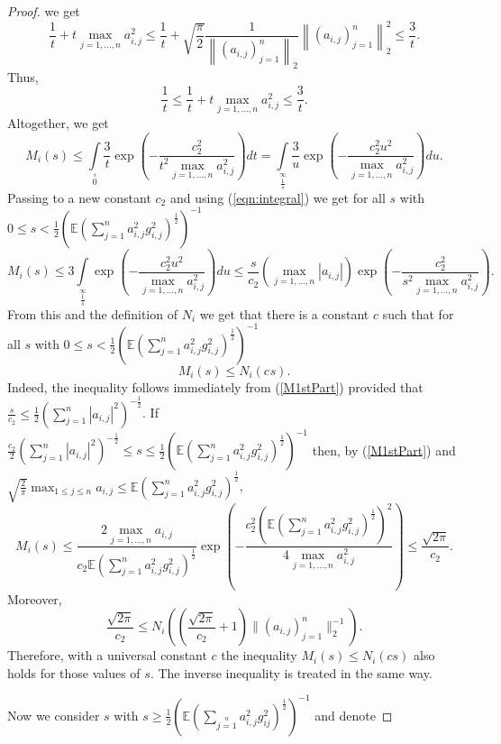 \documentclass[12pt,a4paper]{article}
\newcommand{\Ex}{\mathbb{E}}
\newcommand{\norm}[1]{\left \lVert#1 \right\rVert}
\begin{document}
\begin{proof}
we get
$$
\frac{1}{t}+t\max\limits_{j=1,\dots,n}a_{i,j}^2 
\leq \frac{1}{t}+\sqrt{\frac{\pi}{2}}
\frac{1}{\norm{(a_{i,j})_{j=1}^n}_2}\norm{(a_{i,j})_{j=1}^n}_2^2
\leq\frac{3}{t}.
$$
Thus,
$$
\frac{1}{t}\leq\frac{1}{t}+t\max\limits_{j=1,\dots,n}a_{i,j}^2
\leq\frac{3}{t}.
$$
Altogether, we get
$$
 M_i(s)
	\leq \int\limits_0\limits^{s}\frac{3}{t}\exp\left(-\frac{c_{2}^{2}}{t^2\max\limits_{j=1,\dots,n}a_{i,j}^2}\right)dt
	= \int\limits_{\frac{1}{s}}\limits^{\infty}\frac{3}{u}\exp\left(-\frac{c_{2}^{2}u^{2}}{\max\limits_{j=1,\dots,n}a_{i,j}^2}\right)du.
$$
Passing to a new constant $c_{2}$ and using (\ref{eqn:integral}) we get for all
$s$ with 
$0\leq s<\frac{1}{2}\left(\Ex\left(\sum_{j=1}^na_{i,j}^2g_{i,j}^2\right)^{\frac{1}{2}}\right)^{-1}$
\begin{equation}\label{M1stPart}
M_i(s)
\leq3\int\limits_{\frac{1}{s}}\limits^{\infty}\exp\left(-\frac{c_{2}^{2}u^{2}}{\max\limits_{j=1,\dots,n}a_{i,j}^2}\right)du
\leq \frac{s}{c_{2}}(\max\limits_{j=1,\dots,n}|a_{i,j}|)\exp\left(-\frac{c_{2}^{2}}{s^2\max\limits_{j=1,\dots,n}a_{i,j}^2}\right).
\end{equation}
From this and the definition of $N_{i}$ we get that there is a constant $c$ such that for all $s$ with 
$0\leq s<\frac{1}{2}\left(\Ex\left(\sum_{j=1}^na_{i,j}^2g_{i,j}^2\right)^{\frac{1}{2}}\right)^{-1}$
$$
M_{i}(s)\leq N_{i}(c_{}s).
$$
Indeed, the inequality follows immediately from
(\ref{M1stPart}) provided that $\frac{s}{c_{2}}\leq\frac{1}{2}\left(\sum_{j=1}^n|a_{i,j}|^2\right)^{-\frac{1}{2}}$. If 
$\frac{c_{2}}{2}\left(\sum_{j=1}^n|a_{i,j}|^2\right)^{-\frac{1}{2}}
\leq s\leq
\frac{1}{2}\left(\Ex\left(\sum_{j=1}^na_{i,j}^2g_{i,j}^2\right)^{\frac{1}{2}}\right)^{-1}$
then, by (\ref{M1stPart}) and $\sqrt{\frac{2}{\pi}}\max_{1\leq j\leq n}a_{i,j}\leq\Ex\left(\sum_{j=1}^na_{i,j}^2g_{i,j}^2\right)^{\frac{1}{2}}$,
$$
M_{i}(s)
\leq\frac{2\max\limits_{j=1,\dots,n}a_{i,j}}{c_{2}\Ex\left(\sum_{j=1}^na_{i,j}^2g_{i,j}^2\right)^{\frac{1}{2}}}
\exp\left({-\frac{c_{2}^{2}(\Ex\left(\sum_{j=1}^na_{i,j}^2g_{i,j}^2\right)^{\frac{1}{2}})^{2}}{4\max\limits_{j=1,\dots,n}a_{i,j}^2}}\right)
\leq\frac{\sqrt{2\pi}}{c_{2}}.
$$
Moreover,
$$
\frac{\sqrt{2\pi}}{c_{2}}
\leq
N_{i}\left(\left(\frac{\sqrt{2\pi}}{c_{2}}+1\right)\|(a_{i,j})_{j=1}^{n}\|_{2}^{-1}\right).
$$
Therefore, with a universal constant $c$
the inequality $M_{i}(s)\leq N_{i}(cs)$ also holds for those values of $s$.
The inverse inequality is treated in the same way.
\par
Now we consider $s$ with $s\geq\frac{1}{2}\left(\Ex\left(\sum\limits_{j=1}\limits^{n}a_{i,j}^2g_{ij}^2\right)^{\frac{1}{2}}\right)^{-1}$ and denote

\end{proof}
\end{document}
